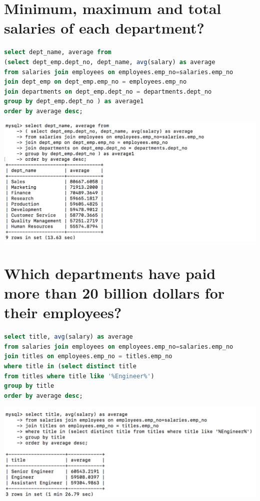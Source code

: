 \documentclass{article}
\begin{document}
\section{Minimum, maximum and total salaries of each department?}
\begin{lstlisting}[language=sql]
select dept_name, average from 
(select dept_emp.dept_no, dept_name, avg(salary) as average 
from salaries join employees on employees.emp_no=salaries.emp_no 
join dept_emp on dept_emp.emp_no = employees.emp_no
join departments on dept_emp.dept_no = departments.dept_no
group by dept_emp.dept_no ) as average1
order by average desc;
\end{lstlisting}
\includegraphics[width=\linewidth]{3.png}

\section{Which departments have paid more than 20 billion dollars for their employees?}
\begin{lstlisting}[language=sql]
select title, avg(salary) as average 
from salaries join employees on employees.emp_no=salaries.emp_no 
join titles on employees.emp_no = titles.emp_no
where title in (select distinct title 
from titles where title like '%Engineer%')
group by title
order by average desc;
\end{lstlisting}
\includegraphics[width=\linewidth]{4.png}
\end{document}
